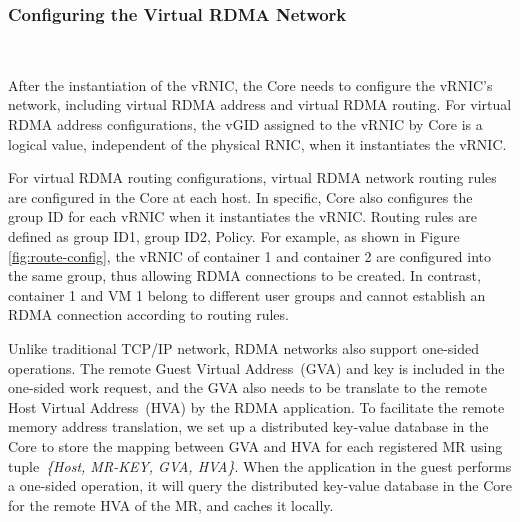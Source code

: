 \subsubsection{\textbf{Configuring the Virtual RDMA Network}}
\
\noindent

After the instantiation of the vRNIC, the \sys Core needs to configure the vRNIC's network, including virtual RDMA address and virtual RDMA routing.
For virtual RDMA address configurations, the vGID assigned to the vRNIC by \sys Core is a logical value, independent of the physical RNIC, when it instantiates the vRNIC.


For virtual RDMA routing configurations, virtual RDMA network routing rules are configured in the \sys Core at each host. In specific, \sys Core also configures the group ID for each vRNIC when it instantiates the vRNIC. Routing rules are defined as {group ID1, group ID2, Policy}. For example, as shown in Figure \ref{fig:route-config}, the vRNIC of container 1 and container 2 are configured into the same group, thus allowing RDMA connections to be created. In contrast, container 1 and VM 1 belong to different user groups and cannot establish an RDMA connection according to routing rules.


Unlike traditional TCP/IP network, RDMA networks also support one-sided operations. The remote Guest Virtual Address~(GVA) and key is included in the one-sided work request, and the GVA also needs to be translate to the remote Host Virtual Address~(HVA) by the RDMA application. To facilitate the remote memory address translation, we set up a distributed key-value database in the \sys Core to store the mapping between GVA and HVA for each registered MR using tuple~\textit{\{Host, MR-KEY, GVA, HVA\}}. When the application in the guest performs a one-sided operation, it will query the distributed key-value database in the \sys Core for the remote HVA of the MR, and caches it locally.

